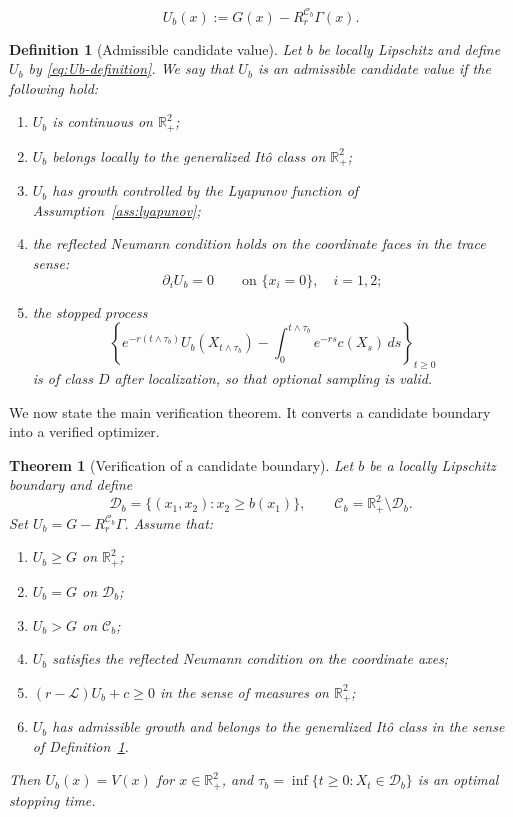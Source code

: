 \documentclass[10pt,a4paper]{amsart}
\newtheorem{definition}{Definition}
\newtheorem{theorem}{Theorem}
\begin{document}
\begin{equation} \label{eq:Ub-definition} 
U_b(x):=G(x)-R_r^{\mathcal C_b}\Gamma(x). 
\end{equation} 

\begin{definition}[Admissible candidate value] \label{def:admissible-candidate-value} 
Let \(b\) be locally Lipschitz and define \(U_b\) by \eqref{eq:Ub-definition}. We say that \(U_b\) is an admissible candidate value if the following hold: 
\begin{enumerate}[label=(\roman*)] 
\item \(U_b\) is continuous on \(\mathbb R_+^2\); 
\item \(U_b\) belongs locally to the generalized It\^{o} class on \(\mathbb R_+^2\); 
\item \(U_b\) has growth controlled by the Lyapunov function of Assumption~\ref{ass:lyapunov}; 
\item the reflected Neumann condition holds on the coordinate faces in the trace sense: 
\[ 
\partial_i U_b=0 \qquad\text{on }\{x_i=0\},\quad i=1,2; 
\] 
\item the stopped process \[ \left\{ e^{-r(t\wedge\tau_b)}U_b(X_{t\wedge\tau_b}) - \int_0^{t\wedge\tau_b}e^{-rs}c(X_s)\,ds \right\}_{t\ge0} \] is of class \(D\) after localization, so that optional sampling is valid. \end{enumerate} 
\end{definition} 

We now state the main verification theorem. It converts a candidate boundary into a verified optimizer. \begin{theorem}[Verification of a candidate boundary] \label{thm:verification-boundary} Let \(b\) be a locally Lipschitz boundary and define 
\[ \mathcal D_b=\{(x_1,x_2):x_2\ge b(x_1)\}, \qquad \mathcal C_b=\mathbb R_+^2\setminus\mathcal D_b. \] 
Set 
$\displaystyle U_b=G-R_r^{\mathcal C_b}\Gamma$.  
Assume that: 
\begin{enumerate}[label=(\roman*)]
\item \(U_b\ge G\) on \(\mathbb R_+^2\); 
\item \(U_b=G\) on \(\mathcal D_b\); 
\item \(U_b>G\) on \(\mathcal C_b\); 
\item \(U_b\) satisfies the reflected Neumann condition on the coordinate axes; 
\item \((r-\mathcal L)U_b+c\ge0\) in the sense of measures on \(\mathbb R_+^2\); 
\item \(U_b\) has admissible growth and belongs to the generalized It\^{o} class in the sense of Definition~\ref{def:admissible-candidate-value}. 
\end{enumerate} 
Then 
$U_b(x)=V(x)$ for $x\in\mathbb R_+^2$, 
and 
$\tau_b=\inf\{t\ge0:X_t\in\mathcal D_b\}$ 
is an optimal stopping time. 
\end{theorem} 
\end{document}
